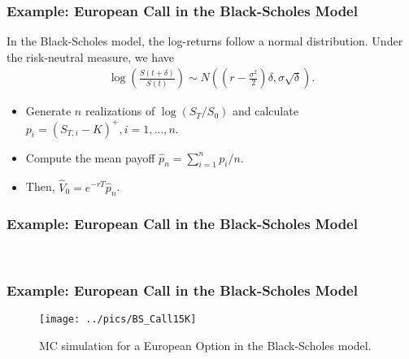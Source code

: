 \begin{frame}[fragile]
\frametitle{Example: European Call in the Black-Scholes Model}
In the Black-Scholes model, the log-returns follow a normal distribution. Under
the risk-neutral measure, we have
\begin{align*}
  \log\left(\frac{S(t+\delta)}{S(t)} \right) \sim
  N\left(\left( r-\frac{\sigma^2}{2}\right)\delta,\sigma \sqrt{\delta}\right).
\end{align*}
\begin{itemize}
  \item Generate $n$ realizations of $\log(S_{T}/S_0)$ and calculate
  $p_i=(S_{T,i}-K)^+, i=1,\ldots,n$.
  \item Compute the mean payoff $\hat{p}_n=\sum_{i=1}^n p_i/n$.
  \item Then, $\hat{V}_0 = e^{-rT}\hat{p}_n$.
\end{itemize}
\end{frame}

\begin{frame}[fragile]
\frametitle{Example: European Call in the Black-Scholes Model}
\begin{center}
\\

\end{center}
\end{frame}

\begin{frame}[fragile]
\frametitle{Example: European Call in the Black-Scholes Model}
\begin{figure}[htp]
\begin{center}
  \texttt{[image: ../pics/BS\_Call15K]}
  \caption{MC simulation for a European Option in the Black-Scholes model.}
\end{center}
\end{figure}
\end{frame}


